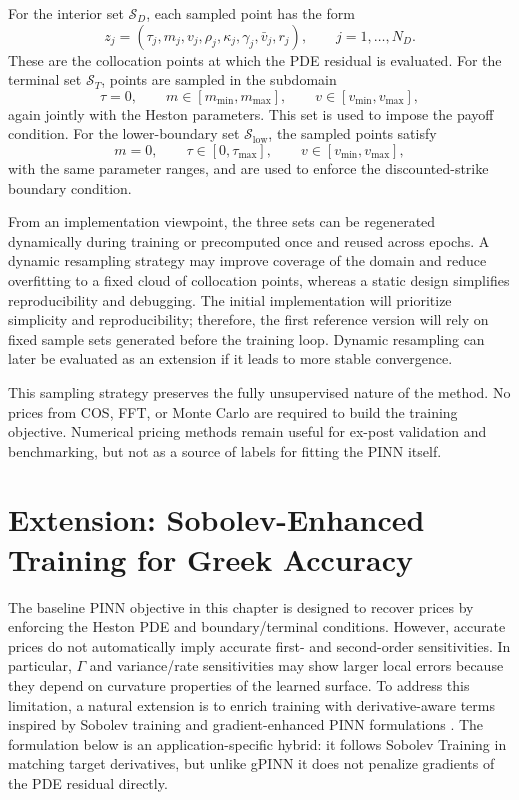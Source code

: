 For the interior set $\mathcal{S}_D$, each sampled point has the form
\[
z_j=(\tau_j,m_j,v_j,\rho_j,\kappa_j,\gamma_j,\bar v_j,r_j),
\qquad j=1,\dots,N_D.
\]
These are the collocation points at which the PDE residual is evaluated. For the terminal set $\mathcal{S}_T$, points are sampled in the subdomain
\[
\tau=0,\qquad
m \in [m_{\min},m_{\max}],\qquad
v \in [v_{\min},v_{\max}],
\]
again jointly with the Heston parameters. This set is used to impose the payoff condition. For the lower-boundary set $\mathcal{S}_{\mathrm{low}}$, the sampled points satisfy
\[
m=0,\qquad
\tau \in [0,\tau_{\max}],\qquad
v \in [v_{\min},v_{\max}],
\]
with the same parameter ranges, and are used to enforce the discounted-strike boundary condition.

From an implementation viewpoint, the three sets can be regenerated dynamically during training or precomputed once and reused across epochs. A dynamic resampling strategy may improve coverage of the domain and reduce overfitting to a fixed cloud of collocation points, whereas a static design simplifies reproducibility and debugging. The initial implementation will prioritize simplicity and reproducibility; therefore, the first reference version will rely on fixed sample sets generated before the training loop. Dynamic resampling can later be evaluated as an extension if it leads to more stable convergence.

This sampling strategy preserves the fully unsupervised nature of the method. No prices from COS, FFT, or Monte Carlo are required to build the training objective. Numerical pricing methods remain useful for ex-post validation and benchmarking, but not as a source of labels for fitting the PINN itself.

\section{Extension: Sobolev-Enhanced Training for Greek Accuracy}

The baseline PINN objective in this chapter is designed to recover prices by enforcing the Heston PDE and boundary/terminal conditions. However, accurate prices do not automatically imply accurate first- and second-order sensitivities. In particular, \(\Gamma\) and variance/rate sensitivities may show larger local errors because they depend on curvature properties of the learned surface. To address this limitation, a natural extension is to enrich training with derivative-aware terms inspired by Sobolev training \cite{czarnecki2017sobolev} and gradient-enhanced PINN formulations \cite{yu2022gpinn}. The formulation below is an application-specific hybrid: it follows Sobolev Training in matching target derivatives, but unlike gPINN it does not penalize gradients of the PDE residual directly.

